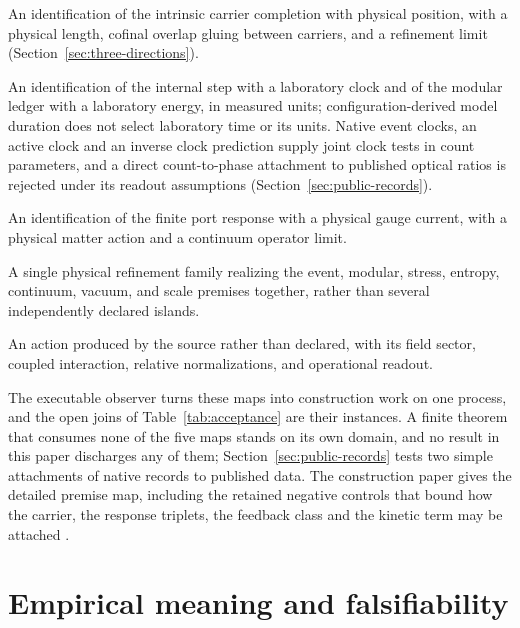 \documentclass[11pt]{article}
\theoremstyle{definition}
\theoremstyle{remark}
\begin{document}
\begin{description}[leftmargin=2.6em]
\item[(M1) Position and scale.] An identification of the intrinsic carrier
completion with physical position, with a physical length, cofinal overlap
gluing between carriers, and a refinement limit
(Section~\ref{sec:three-directions}).
\item[(M2) Clock and energy calibration.] An identification of the internal
step with a laboratory clock and of the modular ledger with a laboratory
energy, in measured units; configuration-derived model duration does not
select laboratory time or its units. Native event clocks, an active clock
and an inverse clock prediction supply joint clock tests in count
parameters, and a direct count-to-phase attachment to published optical
ratios is rejected under its readout assumptions
(Section~\ref{sec:public-records}).
\item[(M3) Laboratory current.] An identification of the finite port response
with a physical gauge current, with a physical matter action and a
continuum operator limit.
\item[(M4) One common physical tower.] A single physical refinement family
realizing the event, modular, stress, entropy, continuum, vacuum, and scale
premises together, rather than several independently declared islands.
\item[(M5) A source-selected action.] An action produced by the source rather
than declared, with its field sector, coupled interaction, relative
normalizations, and operational readout.
\end{description}

The executable observer turns these maps into construction work on one
process, and the open joins of Table~\ref{tab:acceptance} are their
instances. A finite theorem that consumes none of the five maps stands on
its own domain, and no result in this paper discharges any of them;
Section~\ref{sec:public-records} tests two simple attachments of native
records to published data. The construction paper gives the detailed premise
map, including the retained negative controls that bound how the carrier,
the response triplets, the feedback class and the kinetic term may be
attached \cite{ophspine}.

\section{Empirical meaning and falsifiability}
\label{sec:empirical}
\end{document}
